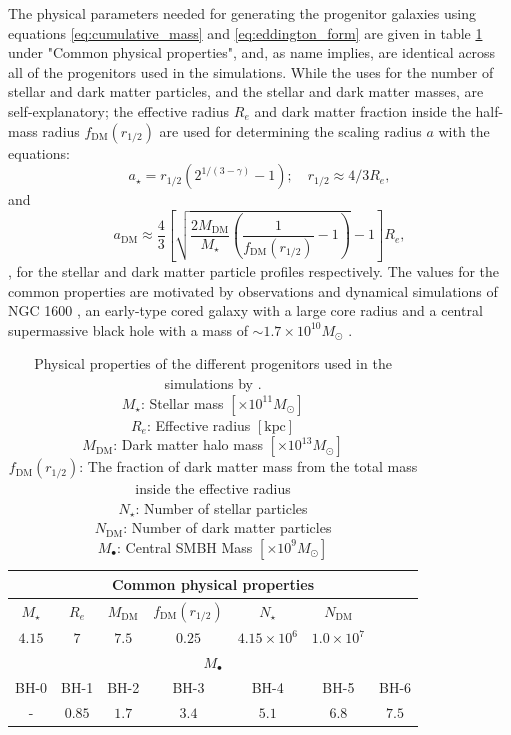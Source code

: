 \documentclass[english, oneside]{HYgradu}
\begin{document}
The physical parameters needed for generating the progenitor galaxies using equations \ref{eq:cumulative_mass} and \ref{eq:eddington_form} are given in table \ref{table:properties} under "Common physical properties", and, as name implies, are identical across all of the progenitors used in the simulations. While the uses for the number of stellar and dark matter particles, and the stellar and dark matter masses, are self-explanatory; the effective radius $R_e$ and dark matter fraction inside the half-mass radius $f_\mathrm{DM}(r_{1/2})$ are used for determining the scaling radius $a$ with the equations:
\begin{equation}
a_\star = r_{1/2}(2^{1/(3-\gamma)}-1); \quad r_{1/2} \approx 4/3 R_e,
\end{equation}
and
\begin{equation}
a_\mathrm{DM} \approx \frac{4}{3} \left[ \sqrt{\frac{2M_\mathrm{DM}}{M_\star} \left( \frac{1}{f_\mathrm{DM}(r_{1/2})} - 1 \right)} -1 \right] R_e,
\end{equation}
, for the stellar and dark matter particle profiles respectively. The values for the common properties are motivated by observations and dynamical simulations of NGC 1600 \citep{Rantala2018}, an early-type cored galaxy with a large core radius and a central supermassive black hole with a mass of $\sim 1.7 \times 10^{10} M_\odot$ \cite{Thomas2016}.

\begin{table}
	\begin{center}
		\begin{tabular}{| c c c c c c c |}
		\hline
		\multicolumn{7}{|c|}{Common physical properties} \\
		\hline
		$M_\star$ & $R_e$ & $M_\mathrm{DM}$ & $f_\mathrm{DM}(r_{1/2})$ & $N_\star$ & $N_\mathrm{DM}$ & \\
		$4.15$ & $7$ & $7.5$ & $0.25$ & $4.15 \times 10^6$ & $1.0 \times 10^7$ & \\
		\hline
		\hline
		\multicolumn{7}{|c|}{$M_\bullet$} \\
		\hline
		BH-0 & BH-1 & BH-2 & BH-3 & BH-4 & BH-5 & BH-6 \\
		- & $0.85$ & $1.7$ & $3.4$ & $5.1$ & $6.8$ & $7.5$ \\
		\hline
		\end{tabular}
	\end{center}
	\caption{Physical properties of the different progenitors used in the simulations by \cite{Rantala2018}. \\
	$M_\star$: Stellar mass $[\times 10^{11} M_\odot]$ \\
	$R_e$: Effective radius $[\mathrm{kpc}]$ \\
	$M_\mathrm{DM}$: Dark matter halo mass $[\times 10^{13} M_\odot]$\\
	$f_\mathrm{DM}(r_{1/2})$: The fraction of dark matter mass from the total mass inside the effective radius \\
	$N_\star$: Number of stellar particles \\
	$N_\mathrm{DM}$: Number of dark matter particles \\
	$M_\bullet$: Central SMBH Mass $[\times 10^9 M_\odot]$}
	\label{table:properties}
\end{table}
\end{document}
